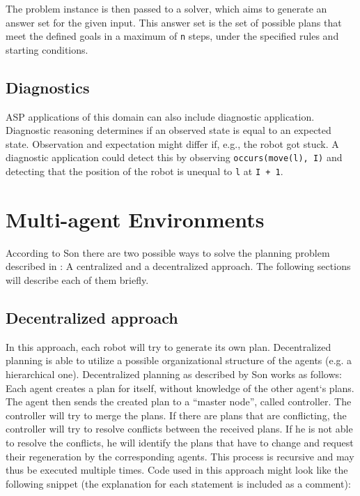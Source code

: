 \documentclass[runningheads]{llncs}
\newcommand{\authorquote}{Son \etal}
\begin{document}
The problem instance is then passed to a solver, which aims to generate an answer set for the given input. This answer set is the set of possible plans that meet the defined goals in a maximum of \verb|n| steps, under the specified rules and starting conditions.

\subsection{Diagnostics} \label{subsec:diagnostics}

ASP applications of this domain can also include diagnostic application. Diagnostic reasoning determines if an observed state is equal to an expected state. Observation and expectation might differ if, e.g., the robot got stuck. A diagnostic application could detect this by observing \verb|occurs(move(l), I)| and detecting that the position of the robot is unequal to \verb|l| at \verb|I + 1|.



  
\section{Multi-agent Environments} \label{8:sec:environments}

According to \authorquote{} there are two possible ways to solve the planning problem described in : A centralized and a decentralized approach. The following sections will describe each of them briefly. 


\subsection{Decentralized approach} \label{8:subsec:decentralized}


    In this approach, each robot will try to generate its own plan. Decentralized planning is able to utilize a possible organizational structure of the agents (e.g. a hierarchical one). Decentralized planning as described by \authorquote{} works as follows: Each agent creates a plan for itself, without knowledge of the other agent`s plans. The agent then sends the created plan to a ``master node'', called controller. The controller will try to merge the plans. If there are plans that are conflicting, the controller will try to resolve conflicts between the received plans. If he is not able to resolve the conflicts, he will identify the plans that have to change and request their regeneration by the corresponding agents. This process is recursive and may thus be executed multiple times. Code used in this approach might look like the following snippet (the explanation for each statement is included as a comment): 
    
\end{document}

